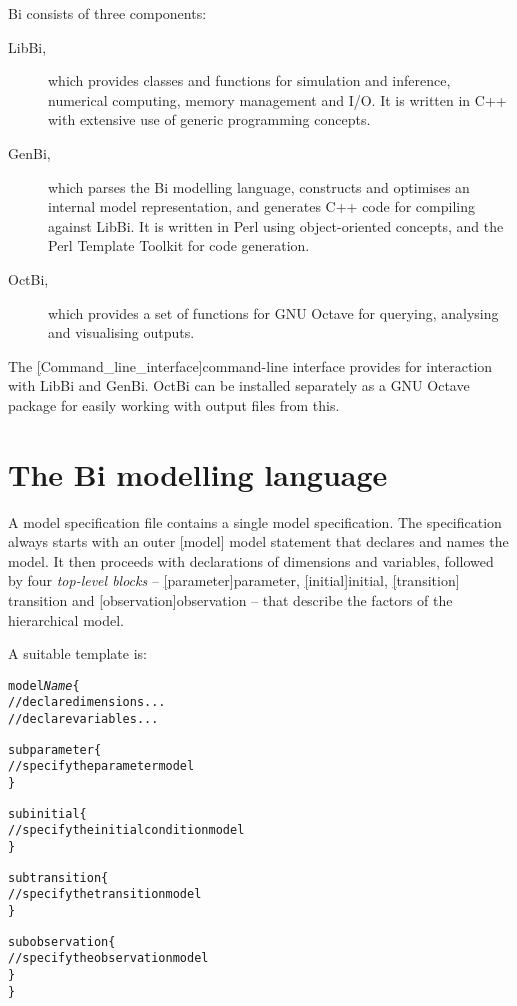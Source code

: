 Bi consists of three components:
\begin{description}
\item[LibBi,] which provides classes and functions for simulation
  and inference, numerical computing, memory management and I/O. It is written
  in C++ with extensive use of generic programming concepts.
\item[GenBi,] which parses the Bi modelling language, constructs
  and optimises an internal model representation, and generates C++ code for
  compiling against LibBi. It is written in Perl using object-oriented
  concepts, and the Perl Template Toolkit for code generation.
\item[OctBi,] which provides a set of functions for GNU Octave
  for querying, analysing and visualising outputs.
\end{description}

The \hyperref[hyper][Command_line_interface]{command-line interface} provides
for interaction with LibBi and GenBi. OctBi can be installed separately as a
GNU Octave package for easily working with output files from this.

\section{The Bi modelling language\label{Modelling_language}}

A model specification file contains a single model specification. The
specification always starts with an outer \hyperref[hyper][model]{\sf
  model} statement that declares and names the model. It then
proceeds with declarations of dimensions and variables, followed by four
\emph{top-level blocks} -- \hyperref[hyper][parameter]{\sf parameter},
\hyperref[hyper][initial]{\sf initial}, \hyperref[hyper][transition]{\sf
  transition} and \hyperref[hyper][observation]{\sf observation} -- that
describe the factors of the hierarchical model.

A suitable template is:
\begin{alltt}{\sf
    model \textsl{Name} \{
      // declare dimensions...
      // declare variables...

      sub parameter \{
        // specify the parameter model
      \}

      sub initial \{
        // specify the initial condition model
      \}

      sub transition \{
        // specify the transition model
      \}

      sub observation \{
        // specify the observation model
      \}
    \}
}\end{alltt}

